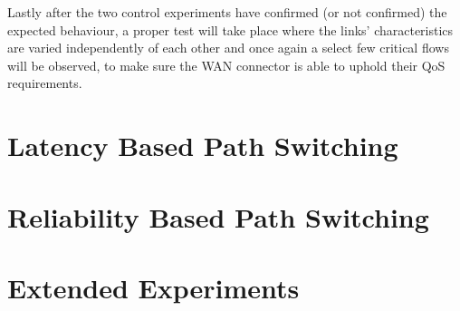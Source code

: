 Lastly after the two control experiments have confirmed (or not confirmed) the expected behaviour, a proper test will take place where the links' characteristics are varied independently of each other and once again a select few critical flows will be observed, to make sure the WAN connector is able to uphold their QoS requirements.


\section{Latency Based Path Switching}
\section{Reliability Based Path Switching}

\section{Extended Experiments}